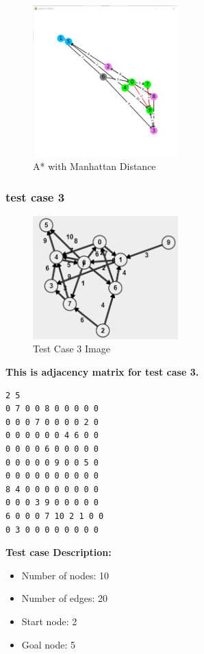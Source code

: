 \begin{figure}[h!]
    \centering
    \includegraphics[width=0.5\textwidth]{result/testcase2/astar2.png}
    \caption{A* with Manhattan Distance}
\end{figure}
\clearpage
\subsubsection{test case 3}
\begin{figure}[h!]
    \centering
    \includegraphics[width=0.5\textwidth]{testcase/3.PNG}
    \caption{Test Case 3 Image}
\end{figure}
\textbf{This is adjacency matrix for test case 3.}
\begin{verbatim}
2 5
0 7 0 0 8 0 0 0 0 0
0 0 0 7 0 0 0 0 2 0
0 0 0 0 0 0 4 6 0 0
0 0 0 0 6 0 0 0 0 0
0 0 0 0 0 9 0 0 5 0
0 0 0 0 0 0 0 0 0 0
8 4 0 0 0 0 0 0 0 0
0 0 0 3 9 0 0 0 0 0
6 0 0 0 7 10 2 1 0 0
0 3 0 0 0 0 0 0 0 0    
\end{verbatim}
\textbf{Test case Description:}
\begin{itemize}
    \item Number of nodes: 10 
    \item Number of edges: 20
    \item Start node: 2
    \item Goal node: 5
\end{itemize}

